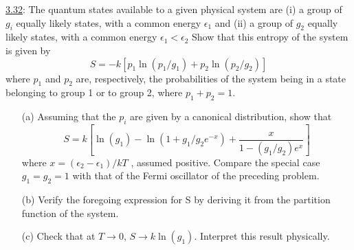 \documentclass{report}
\begin{document}
\underline{3.32}: The quantum states available to a given physical system are (i) a group of $g_i$ equally likely
states, with a common energy $\epsilon_1$ and (ii) a group of $g_2$ equally likely states, with a common
energy $\epsilon_1<\epsilon_2$ Show that this entropy of the system is given by
\[
    S = -k[p_1\ln(p_1/g_1)+p_2\ln(p_2/g_2)]
\]
where $p_1$ and $p_2$ are, respectively, the probabilities of the system being in a state belonging to
group 1 or to group 2, where $p_1 + p_2 = 1$.
\begin{itemize}
    \item [(a)] Assuming that the $p_i$ are given by a canonical distribution, show that
    \[
    S = k\left[\ln(g_1)-\ln(1+g_1/g_2e^{-x})+\frac{x}{1-(g_1/g_2)e^x}\right]
    \]
    where $x = (\epsilon_2 − \epsilon_1)/kT$ , assumed positive. Compare the special case $g_1 = g_2 = 1$ with that
    of the Fermi oscillator of the preceding problem.
    \item[(b)] Verify the foregoing expression for S by deriving it from the partition function of the system.
    \item[(c)] Check that at $T\to 0$, $S\to k \ln(g_1)$. Interpret this result physically.
\end{itemize}
\end{document}
